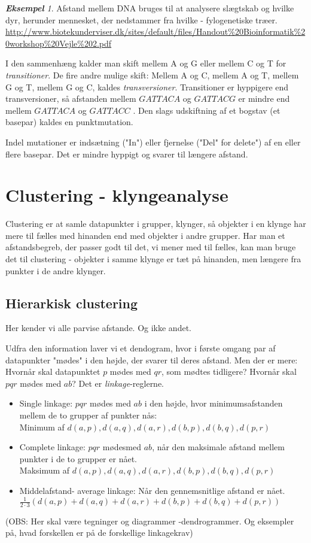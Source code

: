\documentclass[a4paper, 12pt]{article}
\theoremstyle{remark}
\newtheorem{Eksempel}{\textbf{Eksempel}}
\begin{document}
\begin{Eksempel}
Afstand mellem DNA bruges til at analysere slægtskab og hvilke dyr, herunder mennesket, der nedstammer fra hvilke - fylogenetiske træer.\\ \url{ http://www.biotekunderviser.dk/sites/default/files/Handout\%20Bioinformatik\%20workshop\%20Vejle\%202.pdf}

I den sammenhæng kalder man skift mellem A og G eller mellem C og T for \emph{transitioner}. De fire andre mulige skift: Mellem A og C, mellem A og T, mellem G og T, mellem G og C, kaldes \emph{transversioner}. Transitioner er hyppigere end transversioner, så afstanden mellem $GATTACA$ og $GATTACG$ er mindre end mellem $GATTACA$ og $GATTACC$ . Den slags udskiftning af et bogstav (et basepar) kaldes en punktmutation.

Indel mutationer er indsætning ("In") eller fjernelse ("Del" for delete") af en eller flere basepar. Det er mindre hyppigt og svarer til længere afstand. 


\end{Eksempel}

\section*{Clustering - klyngeanalyse}

Clustering er at samle datapunkter i grupper, klynger, så objekter i en klynge har mere til fælles med hinanden end med objekter i andre grupper. Har man et afstandsbegreb, der passer godt til det, vi mener med til fælles, kan man bruge det til clustering - objekter i samme klynge er tæt på hinanden, men længere fra punkter i de andre klynger. 
\subsection*{Hierarkisk clustering}
Her kender vi alle parvise afstande. Og ikke andet. 

Udfra den information laver vi et dendogram, hvor i første omgang par af datapunkter "mødes" i den højde, der svarer til deres afstand. Men der er mere: Hvornår skal datapunktet $p$ mødes med $qr$, som mødtes tidligere? Hvornår skal $pqr$ mødes med $ab$?  Det er \emph{linkage}-reglerne.
\begin{itemize}
\item Single linkage: $pqr$ mødes med $ab$ i den højde, hvor minimumsafstanden mellem de to grupper af punkter nås:\\ Minimum af $d(a,p),d(a,q), d(a,r), d(b,p), d(b,q), d(p,r)$
\item Complete linkage: $pqr$ mødesmed $ab$, når den maksimale afstand mellem punkter i de to grupper er nået. \\Maksimum af $d(a,p),d(a,q), d(a,r), d(b,p), d(b,q), d(p,r)$
\item Middelafstand- average linkage: Når den gennemsnitlige afstand er nået. $\frac{1}{2\cdot 3}(d(a,p)+d(a,q)+ d(a,r)+ d(b,p)+ d(b,q)+ d(p,r))$
\end{itemize}
(OBS: Her skal være tegninger og diagrammer -dendrogrammer. Og eksempler på, hvad forskellen er på de forskellige linkagekrav)
\end{document}

